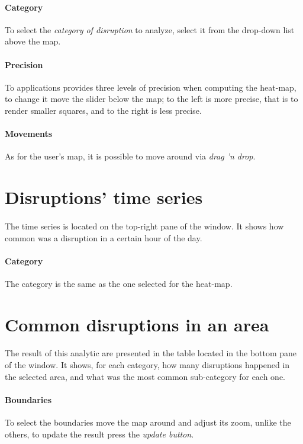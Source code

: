 \paragraph{Category}
To select the \textit{category of disruption} to analyze, select it from the 
drop-down list above the map.

\paragraph{Precision}
To applications provides three levels of precision when computing the heat-map, 
to change it move the slider below the map; to the left is more precise, that 
is to render smaller squares, and to the right is less precise.

\paragraph{Movements}
As for the user's map, it is possible to move around via \textit{drag 'n drop}.

\section{Disruptions' time series}

\paragraph{}
The time series is located on the top-right pane of the window. It shows how 
common was a disruption in a certain hour of the day.

\paragraph{Category}
The category is the same as the one selected for the heat-map.

\section{Common disruptions in an area}

\paragraph{}
The result of this analytic are presented in the table located in the bottom 
pane of the window. It shows, for each category, how many disruptions happened 
in the selected area, and what was the most common sub-category for each one.

\paragraph{Boundaries}
To select the boundaries move the map around and adjust its zoom, unlike the 
others, to update the result press the \textit{update button}.  